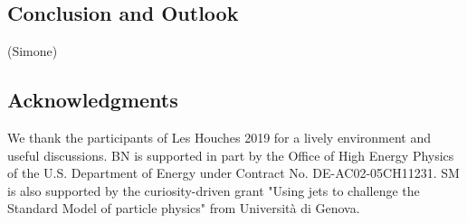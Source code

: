 \documentclass[11pt]{cernrep}
\begin{document}
\subsection{Conclusion and Outlook}
\label{sec:jets:conclusion}
(Simone)

\subsection*{Acknowledgments}

We thank the participants of Les Houches 2019 for a lively environment and useful discussions.
BN is supported in part by the Office of High Energy Physics of the U.S. Department of Energy under Contract No. DE-AC02-05CH11231.
%
SM is also supported by the curiosity-driven grant "Using jets to challenge the Standard Model of particle physics" from Universit\`a di Genova.


\end{document}
